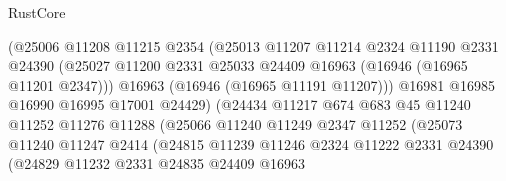 \begin{lexlean}{RustCore}
\begin{coremodule}
                                  (@25006
                                    @11208
                                    @11215
                                    @2354
                                    (@25013
                                      @11207
                                      @11214
                                      @2324
                                      @11190
                                      @2331
                                      @24390
                                      (@25027
                                        @11200
                                        @2331
                                        @25033
                                        @24409
                                        @16963
                                        (@16946 (@16965 @11201 @2347)))
                                      @16963
                                      (@16946 (@16965 @11191 @11207)))
                                    @16981
                                    @16985
                                    @16990
                                    @16995
                                    @17001
                                    @24429)
                                  (@24434
                                    @11217
                                    @674
                                    @683
                                    @45
                                    @11240
                                    @11252
                                    @11276
                                    @11288
                                    (@25066
                                      @11240
                                      @11249
                                      @2347
                                      @11252
                                      (@25073
                                        @11240
                                        @11247
                                        @2414
                                        (@24815
                                          @11239
                                          @11246
                                          @2324
                                          @11222
                                          @2331
                                          @24390
                                          (@24829
                                            @11232
                                            @2331
                                            @24835
                                            @24409
                                            @16963

\end{coremodule}
\end{lexlean}

